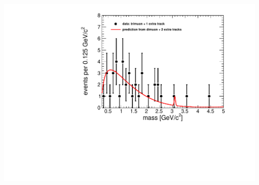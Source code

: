 \documentclass[compress]{beamer}
\begin{document}
\begin{frame}
\begin{columns}
\includegraphics[width=\linewidth]{fullscale-control_fakes.pdf}
\end{columns}
\end{frame}
\end{document}

